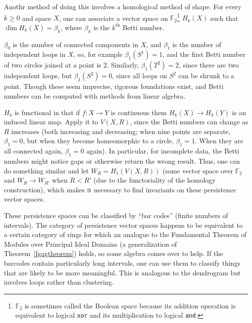 Anothr method of doing this involves a homological method of shape. For every $k\ge 0$ and space $X$, one can associate a vector space on $\mathbb F_2$\footnote{$\mathbb F_2$ is sometimes called the Boolean space because its addition operation is equivalent to logical \texttt{xor} and its multiplication to logical \texttt{and}.} $H_k(X)$ such that $\dim H_k(X) = \beta_k$, where $\beta_k$ is the $k^{\mathrm{th}}$ Betti number.

$\beta_0$ is the number of connected components in $X$, and $\beta_1$ is the number of independent loops in $X$, so, for example $\beta_1(S^1) = 1$, and the first Betti number of two circles joined at a point is 2. Similarly, $\beta_1(T^2) = 2$, since there are two independent loops, but $\beta_1(S^2) = 0$, since all loops on $S^2$ can be shrunk to a point. Though these seem imprecise, rigorous foundations exist, and Betti numbers can be computed with methods from linear algebra.

$H_k$ is functional in that if $f:X\to Y$ is continuous them $H_k(X)\to H_k(Y)$ is an induced linear map. Apply it to $V(X,R)$, since the Betti numbers can change as $R$ imcreases (both increasing and decreasing; when nine points are separate, $\beta_1 = 0$, but when they become homeomorphic to a circle, $\beta_1 = 1$. When they are all connected again, $\beta_1 = 0$ again). In particular, for incomplete data, the Betti numbers might notice gaps or otherwise return the wrong result. Thus, one can do something similar and let $W_R = H_1(V(X,R))$ (some vector space over $\mathbb F_2$ and $W_R\to W_{R'}$ when $R < R'$ (due to the functoriality of the homology construction), which makes it necessary to find invariants on these persistence vector spaces.

These persistence spaces can be classified by ``bar codes'' (finite numbers of intervals). The category of persistence vector spaces happens to be equivalent to a certain category of rings for which an analogue to the Fundamental Theorem of Modules over Principal Ideal Domains (a generalization of Theorem~\ref{fgagtheorem}) holds, so some algebra comes over to help. If the barcodes contain  particularly long intervals, one can use them to classify things that are likely to be more meaningful. This is analogous to the dendrogram but involves loops rather than clustering.


